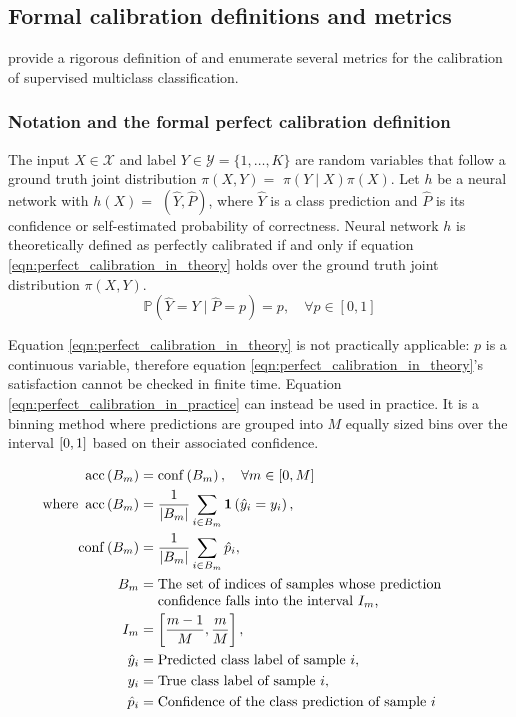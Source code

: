 \subsection{Formal calibration definitions and metrics}
\label{subsection_calibration_definition}
\cite{guo2017calibration} provide a rigorous definition of and enumerate several metrics for the calibration of supervised multiclass classification.

\subsubsection{Notation and the formal perfect calibration definition}
The input $X \in \mathcal{X}$ and label $Y \in \mathcal{Y}=\{1, \ldots, K\}$ are random variables that follow a ground truth joint distribution $\pi(X, Y)=$ $\pi(Y \mid X) \pi(X)$. Let $h$ be a neural network with $h(X)=$ $(\hat{Y}, \hat{P})$, where $\hat{Y}$ is a class prediction and $\hat{P}$ is its confidence or self-estimated probability of correctness. Neural network $h$ is theoretically defined as perfectly calibrated if and only if equation \ref{eqn:perfect_calibration_in_theory} holds over the ground truth joint distribution $\pi(X, Y)$.
\begin{equation}
  \label{eqn:perfect_calibration_in_theory}
  \mathbb{P}(\hat{Y}=Y \mid \hat{P}=p)=p, \quad \forall p \in[0,1]
\end{equation}

Equation \ref{eqn:perfect_calibration_in_theory} is not practically applicable: $p$ is a continuous variable, therefore equation \ref{eqn:perfect_calibration_in_theory}'s satisfaction cannot be checked in finite time. Equation \ref{eqn:perfect_calibration_in_practice} can instead be used in practice. It is a binning method where predictions are grouped into $M$ equally sized bins over the interval $\interval{0}{1}$ based on their associated confidence.

\begin{align}
  \label{eqn:perfect_calibration_in_practice}
  \operatorname{acc}\left(B_{m}\right) &= \operatorname{conf}\left(B_{m}\right), \quad \forall m \in[0,M] \\ \nonumber
  \text{where}~\operatorname{acc}\left(B_{m}\right) &= \frac{1}{\left|B_{m}\right|} \sum_{i \in B_{m}} \mathbf{1}\left(\hat{y}_{i}=y_{i}\right), \\ \nonumber
  \operatorname{conf}\left(B_{m}\right) &= \frac{1}{\left|B_{m}\right|} \sum_{i \in B_{m}} \hat{p}_{i}, \\ \nonumber
  B_{m} &= \parbox[t]{8cm}{\raggedright The set of indices of samples whose prediction confidence falls into the interval $I_{m}$,} \\ \nonumber
  I_{m} &= \left[\frac{m-1}{M}, \frac{m}{M}\right], \\ \nonumber
  \hat{y}_{i} &= \text{Predicted class label of sample $i$}, \\ \nonumber
  y_{i} &= \text{True class label of sample $i$}, \\ \nonumber
  \hat{p}_{i} &= \text{Confidence of the class prediction of sample $i$}
\end{align}

